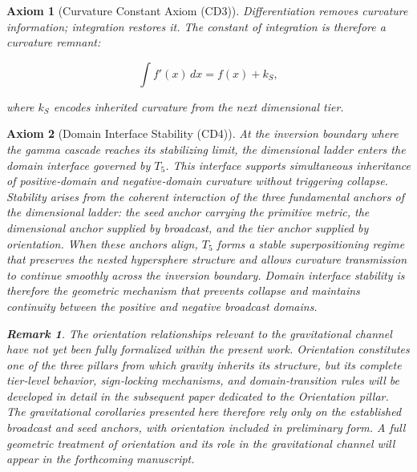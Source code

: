 \documentclass[final,onefignum,onetabnum]{siamart}
\newtheorem{axiom}{Axiom}
\newtheorem{remark}{Remark}
\begin{document}
\begin{axiom}[Curvature Constant Axiom (CD3)]
Differentiation removes curvature information; integration restores it. The constant of integration is therefore a curvature remnant:

\[
\int f'(x)\,dx = f(x) + k_{S},
\]

where $k_{S}$ encodes inherited curvature from the next dimensional tier.
\end{axiom}

\begin{axiom}[Domain Interface Stability (CD4)]
At the inversion boundary where the gamma cascade reaches its stabilizing limit, the dimensional ladder enters the domain interface governed by $T_5$. This interface supports simultaneous inheritance of positive‑domain and negative‑domain curvature without triggering collapse. Stability arises from the coherent interaction of the three fundamental anchors of the dimensional ladder: the seed anchor carrying the primitive metric, the dimensional anchor supplied by broadcast, and the tier anchor supplied by orientation. When these anchors align, $T_5$ forms a stable superpositioning regime that preserves the nested hypersphere structure and allows curvature transmission to continue smoothly across the inversion boundary. Domain interface stability is therefore the geometric mechanism that prevents collapse and maintains continuity between the positive and negative broadcast domains.

\begin{remark}
The orientation relationships relevant to the gravitational channel have not yet been fully formalized within the present work. Orientation constitutes one of the three pillars from which gravity inherits its structure, but its complete tier‑level behavior, sign‑locking mechanisms, and domain‑transition rules will be developed in detail in the subsequent paper dedicated to the Orientation pillar. The gravitational corollaries presented here therefore rely only on the established broadcast and seed anchors, with orientation included in preliminary form. A full geometric treatment of orientation and its role in the gravitational channel will appear in the forthcoming manuscript.
\end{remark}
\end{axiom}
\end{document}
